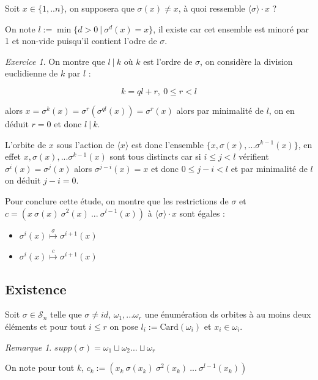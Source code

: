 \documentclass[]{article}
\theoremstyle{remark}
\newtheorem{myrem}{Remarque}
\newtheorem{myexer}{Exercice}
\theoremstyle{definition}
\begin{document}
Soit $x \in \{1, ..n\}$, on supposera que $\sigma(x) \neq x$, à quoi ressemble $\langle \sigma \rangle \cdot x$ ?

On note $l := \min \{d > 0 ~ | ~ \sigma^d(x) = x\}$, il existe car cet ensemble est minoré par 1 et non-vide puisqu'il contient l'odre de $\sigma$.

\begin{myexer}
	On montre que $l ~ | ~ k$ où $k$ est l'ordre de $\sigma$, on considère la division euclidienne de $k$ par $l$ :
	
	$$k = ql + r, ~ 0 \leqslant r < l$$
	
	alors $x = \sigma^k(x) = \sigma^r(\sigma^{ql}(x)) = \sigma^r(x)$ alors par minimalité de $l$, on en déduit $r = 0$ et donc $l ~ | ~ k$.
\end{myexer}

L'orbite de $x$ sous l'action de $\langle x \rangle$ est donc l'ensemble $\{x, \sigma(x), ... \sigma^{k-1}(x)\}$, en effet $x, \sigma(x), ... \sigma^{k-1}(x)$ sont tous distincts car si $i \leqslant j < l$ vérifient $\sigma^i(x) = \sigma^j(x)$ alors $\sigma^{j - i}(x) = x$ et donc $0 \leqslant j - i < l$ et par minimalité de $l$ on déduit $j - i = 0$.

Pour conclure cette étude, on montre que les restrictions de $\sigma$ et $c=(x ~ \sigma(x) ~ \sigma^2(x) ~ ... ~ \sigma^{l-1}(x))$ à $\langle\sigma \rangle \cdot x$ sont égales :

\begin{itemize}
	\item $\sigma^i(x)  \stackrel{\sigma}{\longmapsto} \sigma^{i+1}(x)$
	\item $\sigma^i(x)  \stackrel{c}{\longmapsto} \sigma^{i+1}(x)$
\end{itemize}

\subsection{Existence}

Soit $\sigma \in \mathscr{S}_n$ telle que $\sigma \neq id$, $\omega_1, ...\omega_r$ une énumération ds orbites à au moins deux éléments et pour tout $i \leqslant r$ on pose $l_i := \text{Card}(\omega_i)$ et $x_i \in \omega_i$.

\begin{myrem}
	$supp(\sigma) = \omega_1 \sqcup \omega_2 ... \sqcup \omega_r$
\end{myrem}

On note pour tout $k$, $c_k := (x_k ~ \sigma(x_k) ~ \sigma^2(x_k) ~ ... ~ \sigma^{l-1}(x_k))$
\end{document}
